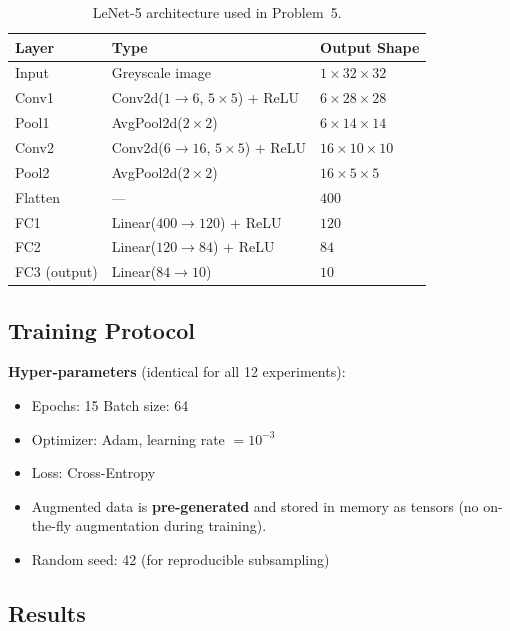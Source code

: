 \documentclass[12pt, a4paper]{article}
\renewcommand{\arraystretch}{1.12}
\begin{document}
\begin{table}[H]
\centering
\renewcommand{\arraystretch}{1.3}
\begin{tabular}{l l l}
\toprule
\textbf{Layer} & \textbf{Type} & \textbf{Output Shape} \\
\midrule
Input       & Greyscale image               & $1 \times 32 \times 32$ \\
Conv1       & Conv2d($1 \to 6$, $5{\times}5$) + ReLU   & $6 \times 28 \times 28$ \\
Pool1       & AvgPool2d($2{\times}2$)        & $6 \times 14 \times 14$ \\
Conv2       & Conv2d($6 \to 16$, $5{\times}5$) + ReLU  & $16 \times 10 \times 10$ \\
Pool2       & AvgPool2d($2{\times}2$)        & $16 \times 5 \times 5$ \\
Flatten     & ---                            & $400$ \\
FC1         & Linear($400 \to 120$) + ReLU   & $120$ \\
FC2         & Linear($120 \to 84$) + ReLU    & $84$ \\
FC3 (output)& Linear($84 \to 10$)            & $10$ \\
\bottomrule
\end{tabular}
\caption{LeNet-5 architecture used in Problem~5.}
\label{tab:prob5_arch}
\end{table}

\newpage
\subsection{Training Protocol}

\textbf{Hyper-parameters} (identical for all 12 experiments):
\begin{itemize}
    \item Epochs: 15 \quad Batch size: 64
    \item Optimizer: Adam, learning rate $= 10^{-3}$
    \item Loss: Cross-Entropy
    \item Augmented data is \textbf{pre-generated} and stored in memory as tensors
          (no on-the-fly augmentation during training).
    \item Random seed: 42 (for reproducible subsampling)
\end{itemize}

\subsection{Results}
\end{document}
